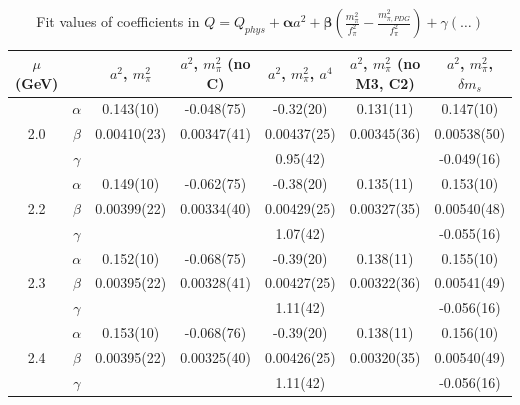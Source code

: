 \documentclass[12pt]{extarticle}
\begin{document}
\begin{table}[h!]
\begin{center}
\begin{tabular}{|c c|c|c|c|c|c|}
\hline
$\mu$ (GeV) &  & $a^2$, $m_\pi^2$& $a^2$, $m_\pi^2$ (no C)& $a^2$, $m_\pi^2$, $a^4$& $a^2$, $m_\pi^2$ (no M3, C2)& $a^2$, $m_\pi^2$, $\delta m_s$\\
\hline
\multirow{3}{0.5in}{2.0} & $\alpha$ & 0.143(10)& -0.048(75)& -0.32(20)& 0.131(11)& 0.147(10)\\
 & $\beta$ & 0.00410(23)& 0.00347(41)& 0.00437(25)& 0.00345(36)& 0.00538(50)\\
 & $\gamma$ &  &  & 0.95(42)&  & -0.049(16)\\
\hline
\multirow{3}{0.5in}{2.2} & $\alpha$ & 0.149(10)& -0.062(75)& -0.38(20)& 0.135(11)& 0.153(10)\\
 & $\beta$ & 0.00399(22)& 0.00334(40)& 0.00429(25)& 0.00327(35)& 0.00540(48)\\
 & $\gamma$ &  &  & 1.07(42)&  & -0.055(16)\\
\hline
\multirow{3}{0.5in}{2.3} & $\alpha$ & 0.152(10)& -0.068(75)& -0.39(20)& 0.138(11)& 0.155(10)\\
 & $\beta$ & 0.00395(22)& 0.00328(41)& 0.00427(25)& 0.00322(36)& 0.00541(49)\\
 & $\gamma$ &  &  & 1.11(42)&  & -0.056(16)\\
\hline
\multirow{3}{0.5in}{2.4} & $\alpha$ & 0.153(10)& -0.068(76)& -0.39(20)& 0.138(11)& 0.156(10)\\
 & $\beta$ & 0.00395(22)& 0.00325(40)& 0.00426(25)& 0.00320(35)& 0.00540(49)\\
 & $\gamma$ &  &  & 1.11(42)&  & -0.056(16)\\
\hline
\end{tabular}
\caption{Fit values of coefficients in $Q = Q_{phys} + \mathbf{\alpha} a^2 + \mathbf{\beta}\left(\frac{m_\pi^2}{f_\pi^2}-\frac{m_{\pi,PDG}^2}{f_\pi^2}\right) + \gamma(\ldots)$}
\end{center}
\end{table}




















\clearpage
\end{document}
